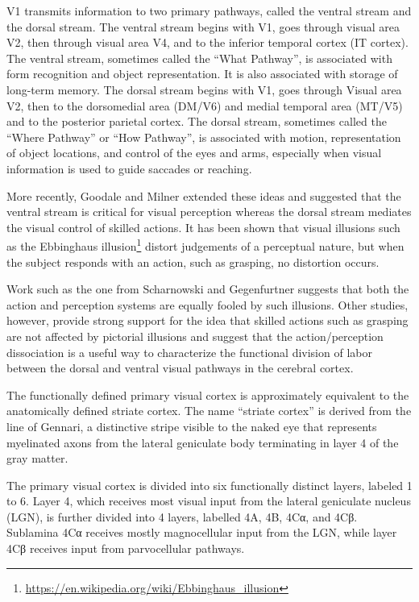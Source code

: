 \documentclass[]{book}
\let\rmarkdownfootnote\footnote%
\def\footnote{\protect\rmarkdownfootnote}
\renewcommand{\href}[2]{#2\footnote{\url{#1}}}
\begin{document}
V1 transmits information to two primary pathways, called the ventral stream and the dorsal stream. The ventral stream begins with V1, goes through visual area V2, then through visual area V4, and to the inferior temporal cortex (IT cortex). The ventral stream, sometimes called the ``What Pathway'', is associated with form recognition and object representation. It is also associated with storage of long-term memory.
The dorsal stream begins with V1, goes through Visual area V2, then to the dorsomedial area (DM/V6) and medial temporal area (MT/V5) and to the posterior parietal cortex. The dorsal stream, sometimes called the ``Where Pathway'' or ``How Pathway'', is associated with motion, representation of object locations, and control of the eyes and arms, especially when visual information is used to guide saccades or reaching.

More recently, Goodale and Milner extended these ideas and suggested that the ventral stream is critical for visual perception whereas the dorsal stream mediates the visual control of skilled actions. It has been shown that visual illusions such as the \href{https://en.wikipedia.org/wiki/Ebbinghaus_illusion}{Ebbinghaus illusion} distort judgements of a perceptual nature, but when the subject responds with an action, such as grasping, no distortion occurs.

Work such as the one from Scharnowski and Gegenfurtner suggests that both the action and perception systems are equally fooled by such illusions. Other studies, however, provide strong support for the idea that skilled actions such as grasping are not affected by pictorial illusions and suggest that the action/perception dissociation is a useful way to characterize the functional division of labor between the dorsal and ventral visual pathways in the cerebral cortex.

The functionally defined primary visual cortex is approximately equivalent to the anatomically defined striate cortex. The name ``striate cortex'' is derived from the line of Gennari, a distinctive stripe visible to the naked eye that represents myelinated axons from the lateral geniculate body terminating in layer 4 of the gray matter.

The primary visual cortex is divided into six functionally distinct layers, labeled 1 to 6. Layer 4, which receives most visual input from the lateral geniculate nucleus (LGN), is further divided into 4 layers, labelled 4A, 4B, 4Cα, and 4Cβ. Sublamina 4Cα receives mostly magnocellular input from the LGN, while layer 4Cβ receives input from parvocellular pathways.
\end{document}
